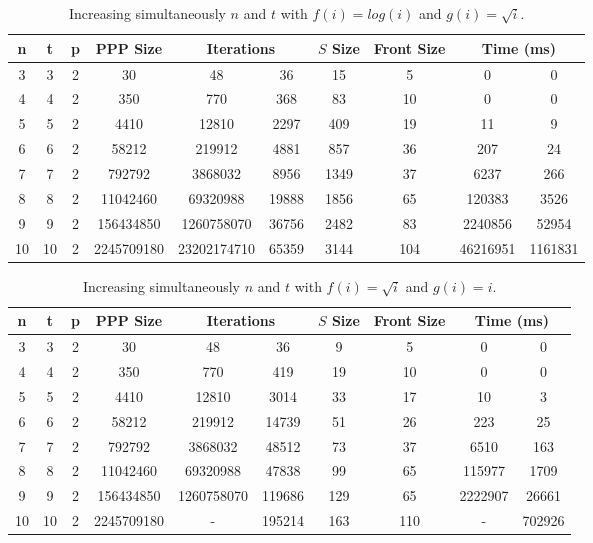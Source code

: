 \documentclass{llncs}
\begin{document}
\begin {table}[H]
\centering
\caption{\label{table:logsqrt} Increasing simultaneously $n$ and $t$ with $f(i)=log(i)$ and $g(i)=\sqrt i$.}
\begin{tabular}{|c|c|c|c|c|c|c|c|c|c|}
  \hline
  n & t & p & PPP Size & \multicolumn{2}{c|}{Iterations} & $S$ Size & Front Size & \multicolumn{2}{c|}{Time (ms)} \\
  \hline
    3 & 3 & 2 & 30 & 48 & 36 & 15 & 5 & 0 & 0\\
    4 & 4 & 2 & 350 &  770 & 368 & 83 & 10 & 0 & 0\\
    5 & 5 & 2 & 4410 & 12810 & 2297 & 409 & 19 & 11 & 9\\
    6 & 6 & 2 & 58212 & 219912 & 4881 & 857 & 36 & 207 & 24\\
    7 & 7 & 2 & 792792 & 3868032 & 8956 & 1349 & 37 & 6237 & 266\\
    8 & 8 & 2 & 11042460 & 69320988 & 19888 & 1856 & 65 & 120383 & 3526\\
    9 & 9 & 2 & 156434850 & 1260758070 & 36756 & 2482 & 83 & 2240856 & 52954\\
    10 & 10 & 2 & 2245709180 & 23202174710 & 65359 & 3144 & 104 & 46216951 & 1161831\\
  \hline
\end{tabular}
\end{table}

\begin {table}[H]
\centering
\caption{\label{table:sqrtlog} Increasing simultaneously $n$ and $t$ with $f(i)=\sqrt i$ and $g(i)=i$.}
\begin{tabular}{|c|c|c|c|c|c|c|c|c|c|}
  \hline
  n & t & p & PPP Size & \multicolumn{2}{c|}{Iterations} & $S$ Size & Front Size & \multicolumn{2}{c|}{Time (ms)} \\
  \hline
    3 & 3 & 2 & 30 & 48 & 36 & 9 & 5 & 0 & 0\\
    4 & 4 & 2 & 350 & 770 & 419 & 19 & 10 & 0 & 0\\
    5 & 5 & 2 & 4410 & 12810 & 3014 & 33 & 17 & 10 & 3\\
    6 & 6 & 2 & 58212 & 219912 & 14739 & 51 & 26 & 223 & 25\\
    7 & 7 & 2 & 792792 & 3868032 & 48512 & 73 & 37 & 6510 & 163\\
    8 & 8 & 2 & 11042460 & 69320988 & 47838 & 99 & 65 & 115977 & 1709\\
    9 & 9 & 2 & 156434850 & 1260758070 & 119686 & 129 & 65 & 2222907  & 26661\\
    10 & 10 & 2 & 2245709180 & - & 195214 & 163 & 110 & - & 702926\\
  \hline
\end{tabular}
\end{table}
\end{document}
